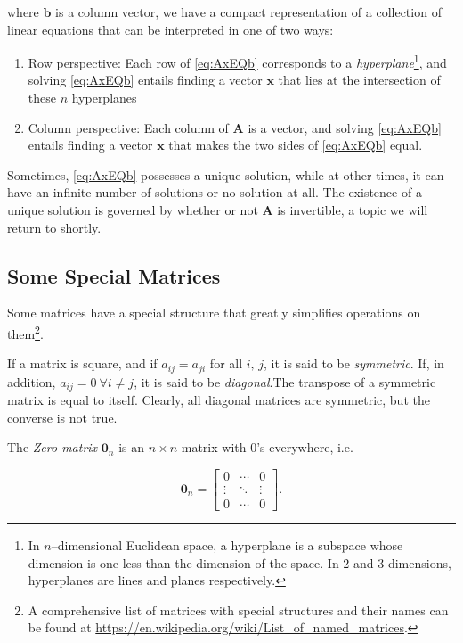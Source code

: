 \documentclass[graybox,envcountchap,sectrefs]{svmono}\usepackage[]{graphicx}\usepackage[]{xcolor}
\begin{document}
\begin{appendices}
where $\mathbf{b}$ is a column vector, we have a compact representation
of a collection of linear equations that can be interpreted in one
of two ways:
\begin{enumerate}
\item Row perspective: Each row of \eqref{eq:AxEQb} corresponds to a \emph{hyperplane}\footnote{In $n$--dimensional Euclidean space, a hyperplane is a subspace
whose dimension is one less than the dimension of the space. In 2
and 3 dimensions, hyperplanes are lines and planes respectively.}, and solving \eqref{eq:AxEQb} entails finding a vector $\mathrm{\mathbf{x}}$
that lies at the intersection of these $n$ hyperplanes
\item Column perspective: Each column of $\mathrm{\mathbf{A}}$ is a vector,
and solving \eqref{eq:AxEQb} entails finding a vector $\mathrm{\mathbf{x}}$
that makes the two sides of \eqref{eq:AxEQb} equal.
\end{enumerate}
Sometimes, \eqref{eq:AxEQb} possesses a unique solution, while at
other times, it can have an infinite number of solutions or no solution
at all. The existence of a unique solution is governed by whether
or not $\mathrm{\mathbf{A}}$ is invertible, a topic we will return
to shortly.

\subsection{Some Special Matrices}

Some matrices have a special structure that greatly simplifies operations
on them\footnote{A comprehensive list of matrices with special structures and their
names can be found at \url{https://en.wikipedia.org/wiki/List_of_named_matrices}.}. 

If a matrix is square, and if $a_{ij}=a_{ji}$ for all $i,\,j$, it
is said to be \emph{symmetric}. If, in addition, $a_{ij}=0\ \forall i\neq j$,
it is said to be \emph{diagonal}.The transpose of a symmetric matrix
is equal to itself. Clearly, all diagonal matrices are symmetric,
but the converse is not true.

The \emph{Zero matrix} $\mathrm{\mathbf{0}}_{n}$ is an $n\times n$
matrix with 0's everywhere, i.e.

\begin{equation}
\mathrm{\mathbf{0}}_{n}=\left[\begin{array}{ccc}
0 & \cdots & 0\\
\vdots & \ddots & \vdots\\
0 & \cdots & 0
\end{array}\right].\label{eq:ZeroMatrix}
\end{equation}


\end{appendices}
\end{document}
